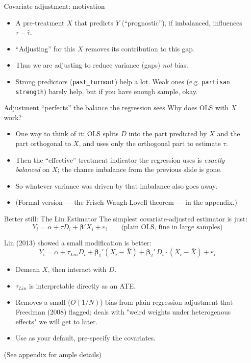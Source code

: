 \documentclass[xcolor=dvipsnames]{beamer}
\renewcommand{\epsilon}{\varepsilon}
\newcommand\be{{\bm\beta}}
\begin{document}
\begin{frame}{Covariate adjustment: motivation}
\small
\begin{itemize}
\item<1-> A pre-treatment $X$ that predicts $Y$ (``prognostic''), if imbalanced, influences $\tau-\hat\tau$. 
  \smallskip
\item<2-> ``Adjusting'' for this $X$ removes its contribution to this gap.
  \smallskip
\item<3-> Thus we are adjusting to reduce variance (gaps) \textit{not} bias.
\smallskip
\item<4-> Strong predictors (\texttt{past\_turnout}) help a lot. Weak
ones (e.g. \texttt{partisan strength}) barely help, but if you have enough sample, okay.
\end{itemize}
\end{frame}


\begin{frame}{Adjustment ``perfects'' the balance the regression sees}
\small
{} Why does OLS with $X$ work?\\
\begin{itemize}
\item<1-> One way to think of it: OLS splits $D$ into the part
  predicted by $X$ and the part orthogonal to $X$, and uses only the
  orthogonal part to estimate $\tau$. \medskip
\item<2-> Then the ``effective'' treatment indicator the
  regression uses is \textit{exactly balanced} on $X$; the chance
  imbalance from the previous slide is gone. \medskip
\item<3-> So whatever variance was driven by that imbalance also
  goes away. \medskip
\item<4-> (Formal version --- the Frisch-Waugh-Lovell theorem --- in the
  appendix.)
\end{itemize}
\end{frame}


\begin{frame}{Better still: The Lin Estimator}
\small
{} The simplest covariate-adjusted estimator is just:\\
\[
Y_i = \alpha + \tau D_i + \be' X_i + \epsilon_i \qquad
\text{(plain OLS, fine in large samples)}
\]

\medskip
{} Lin (2013) showed a small modification is better:\\
\[
Y_i = \alpha + \tau_{Lin} D_i + \be_1' (X_i - \bar X) +
\be_2' \, D_i \cdot (X_i - \bar X) + \epsilon_i
\]
\begin{itemize}
\footnotesize
\item Demean $X$, then interact with $D$.
\item $\tau_{Lin}$ is interpretable directly as an ATE.
\item Removes a small ($O(1/N)$) bias from plain regression adjustment that
  Freedman (2008) flagged; deals with "weird weights under heterogenous effects" 
  we will get to later.
\item Use as your default, pre-specify the covariates.
\end{itemize}
\medskip
{}
(See appendix for ample details)
\end{frame}
\end{document}
